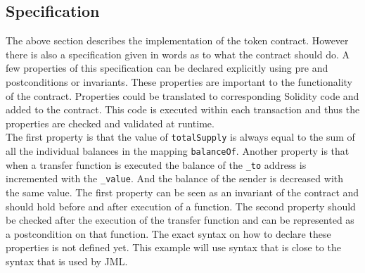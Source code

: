 \documentclass[a4paper]{article}
\begin{document}
\subsection{Specification}
The above section describes the implementation of the token contract. However there is also a specification given in words as to what the contract should do. A few properties of this specification can be declared explicitly using pre and postconditions or invariants. These properties are important to the functionality of the contract. Properties could be translated to corresponding Solidity code and added to the contract. This code is executed within each transaction and thus the properties are checked and validated at runtime. \\
The first property is that the value of \texttt{totalSupply} is always equal to the sum of all the individual balances in the mapping \texttt{balanceOf}. Another property is that when a transfer function is executed the balance of the \texttt{\_to} address is incremented with the \texttt{\_value}. And the balance of the sender is decreased with the same value. The first property can be seen as an invariant of the contract and should hold before and after execution of a function. The second property should be checked after the execution of the transfer function and can be represented as a postcondition on that function. The exact syntax on how to declare these properties is not defined yet. This example will use syntax that is close to the syntax that is used by JML.


 
\end{document}
